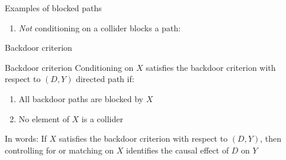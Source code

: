 \documentclass{beamer}
\begin{document}
\begin{frame}{Examples of blocked paths}
\begin{enumerate}
    \item \emph{Not} conditioning on a collider blocks a path:

          \begin{center}
          \end{center}

  \end{enumerate}
\end{frame}


\begin{frame}{Backdoor criterion}


  \begin{block}{Backdoor criterion}
    Conditioning on $X$ satisfies the backdoor criterion with respect to $(D,Y)$ directed path if:
    \begin{enumerate}
      \item All backdoor paths are blocked by $X$
      \item No element of $X$ is a collider
    \end{enumerate}

    In words: If $X$ satisfies the backdoor criterion with respect to $(D,Y)$, then controlling for or matching on $X$ identifies the causal effect of $D$ on $Y$
  \end{block}
\end{frame}
\end{document}
